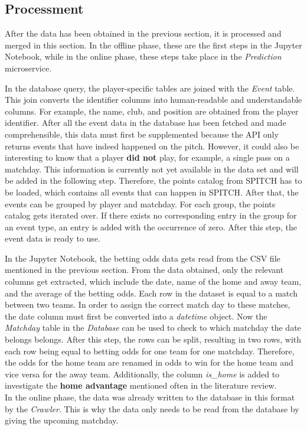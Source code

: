 \subsection{Processment}

After the data has been obtained in the previous section, it is processed and merged in this section. In the offline phase, these are the first steps in the Jupyter Notebook, while in the online phase, these steps take place in the \emph{Prediction} microservice. 

In the database query, the player-specific tables are joined with the \emph{Event} table. This join converts the identifier columns into human-readable and understandable columns. For example, the name, club, and position are obtained from the player identifier. After all the event data in the database has been fetched and made comprehensible, this data must first be supplemented because the API only returns events that have indeed happened on the pitch. However, it could also be interesting to know that a player \textbf{did not} play, for example, a single pass on a matchday. This information is currently not yet available in the data set and will be added in the following step. Therefore, the points catalog from SPITCH \parencite[see][]{spitch_points_2021} has to be loaded, which contains all events that can happen in SPITCH. After that, the events can be grouped by player and matchday. For each group, the points catalog gets iterated over. If there exists no corresponding entry in the group for an event type, an entry is added with the occurrence of zero. After this step, the event data is ready to use.

In the Jupyter Notebook, the betting odds data gets read from the CSV file mentioned in the previous section. From the data obtained, only the relevant columns get extracted, which include the date, name of the home and away team, and the average of the betting odds. Each row in the dataset is equal to a match between two teams. In order to assign the correct match day to these matches, the date column must first be converted into a \emph{datetime} object. Now the \emph{Matchday} table in the \emph{Database} can be used to check to which matchday the date belongs belongs. After this step, the rows can be split, resulting in two rows, with each row being equal to betting odds for one team for one matchday. Therefore, the odds for the home team are renamed in odds to win for the home team and vice versa for the away team. Additionally, the column \emph{is\_home} is added to investigate the \textbf{home advantage} mentioned often in the literature review. \\
In the online phase, the data was already written to the database in this format by the \emph{Crawler}. This is why the data only needs to be read from the database by giving the upcoming matchday.

